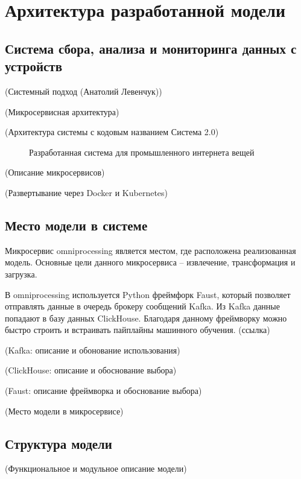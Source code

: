 \section{Архитектура разработанной модели}

\subsection{Система сбора, анализа и мониторинга данных с устройств}

(Системный подход (Анатолий Левенчук))

(Микросервисная архитектура)

(Архитектура системы с кодовым названием Система 2.0)

\begin{figure}[h]
    \caption{Разработанная система для промышленного интернета вещей}
\end{figure}

(Описание микросервисов)

(Развертывание через Docker и Kubernetes)

\subsection{Место модели в системе}

Микросервис omniprocessing является местом, где расположена реализованная модель.
Основные цели данного микросервиса -- извлечение, трансформация и загрузка.

В omniprocessing используется Python фреймфорк Faust, который позволяет отправлять
данные в очередь брокеру сообщений Kafka. Из Kafka данные попадают в базу данных ClickHouse.
Благодаря данному фреймворку можно быстро строить и встраивать пайплайны машинного обучения. (ссылка)

(Kafka: описание и обонование использования)

(ClickHouse: описание и обоснование выбора)

(Faust: описание фреймворка и обоснование выбора)

(Место модели в микросервисе)


\subsection{Структура модели}

(Функциональное и модульное описание модели)

\clearpage